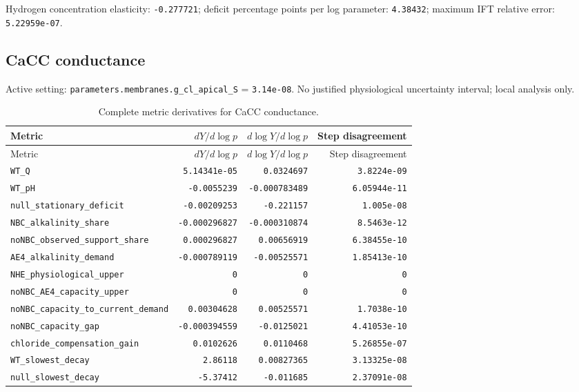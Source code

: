Hydrogen concentration elasticity: \texttt{-0.277721}; deficit percentage points per log parameter: \texttt{4.38432}; maximum IFT relative error: \texttt{5.22959e-07}.\par

\subsection*{CaCC conductance}
Active setting: \nolinkurl{parameters.membranes.g_cl_apical_S} = \texttt{3.14e-08}. No justified physiological uncertainty interval; local analysis only.


\begingroup\scriptsize
\setlength{\tabcolsep}{3pt}
\begin{longtable}{p{.44\linewidth}rrr}
\caption{Complete metric derivatives for CaCC conductance.}\\
\toprule
Metric & $dY/d\log p$ & $d\log Y/d\log p$ & Step disagreement \\
\midrule\endfirsthead
\toprule
Metric & $dY/d\log p$ & $d\log Y/d\log p$ & Step disagreement \\
\midrule\endhead
\bottomrule\endfoot
\nolinkurl{WT_Q} & \texttt{5.14341e-05} & \texttt{0.0324697} & \texttt{3.8224e-09} \\
\nolinkurl{WT_pH} & \texttt{-0.0055239} & \texttt{-0.000783489} & \texttt{6.05944e-11} \\
\nolinkurl{null_stationary_deficit} & \texttt{-0.00209253} & \texttt{-0.221157} & \texttt{1.005e-08} \\
\nolinkurl{NBC_alkalinity_share} & \texttt{-0.000296827} & \texttt{-0.000310874} & \texttt{8.5463e-12} \\
\nolinkurl{noNBC_observed_support_share} & \texttt{0.000296827} & \texttt{0.00656919} & \texttt{6.38455e-10} \\
\nolinkurl{AE4_alkalinity_demand} & \texttt{-0.000789119} & \texttt{-0.00525571} & \texttt{1.85413e-10} \\
\nolinkurl{NHE_physiological_upper} & \texttt{0} & \texttt{0} & \texttt{0} \\
\nolinkurl{noNBC_AE4_capacity_upper} & \texttt{0} & \texttt{0} & \texttt{0} \\
\nolinkurl{noNBC_capacity_to_current_demand} & \texttt{0.00304628} & \texttt{0.00525571} & \texttt{1.7038e-10} \\
\nolinkurl{noNBC_capacity_gap} & \texttt{-0.000394559} & \texttt{-0.0125021} & \texttt{4.41053e-10} \\
\nolinkurl{chloride_compensation_gain} & \texttt{0.0102626} & \texttt{0.0110468} & \texttt{5.26855e-07} \\
\nolinkurl{WT_slowest_decay} & \texttt{2.86118} & \texttt{0.00827365} & \texttt{3.13325e-08} \\
\nolinkurl{null_slowest_decay} & \texttt{-5.37412} & \texttt{-0.011685} & \texttt{2.37091e-08} \\
\end{longtable}
\endgroup

